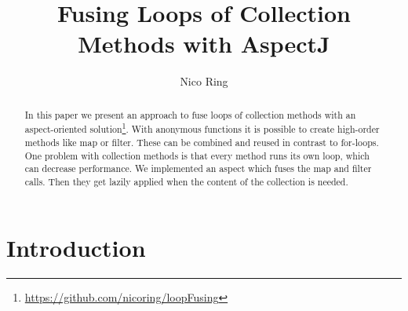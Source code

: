 \documentclass[runningheads,a4paper]{llncs}
\begin{document}


\title{Fusing Loops of Collection Methods with AspectJ}

\author{Nico Ring}

\maketitle

\begin{abstract}
In this paper we present an approach to fuse loops of collection methods with an aspect-oriented solution\footnote{\url{https://github.com/nicoring/loopFusing}}.
With anonymous functions it is possible to create high-order methods like map or filter. These can be combined and reused in contrast to for-loops.
One problem with collection methods is that every method runs its own loop, which can decrease performance. We implemented an aspect which fuses the map and filter calls.
Then they get lazily applied when the content of the collection is needed.

\end{abstract}


\section{Introduction}\label{sec:intro}
\end{document}

